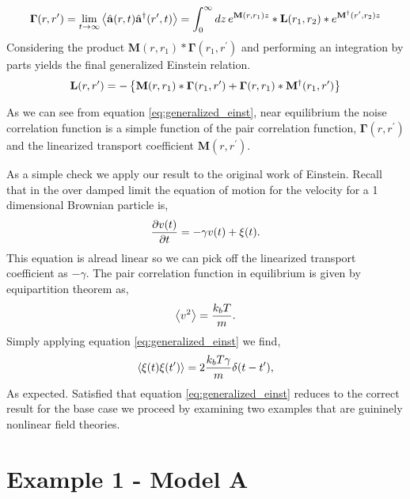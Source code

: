 %
\begin{equation}
    \mathbf{\Gamma}(r, r^\prime) = \lim_{t\rightarrow\infty}
    \left\langle \hat{\mathbf{a}}(r, t)\hat{\mathbf{a}}^\dagger(r^\prime, t) \right\rangle =
    \int_0^\infty dz \,e^{\mathbf{M}(r, r_1)z}\ast\mathbf{L}(r_1, r_2)\ast
    e^{\mathbf{M}^\dagger(r^\prime, r_2)z}
\end{equation}
%
Considering the product $\mathbf{M}(r, r_1)\ast\mathbf{\Gamma}(r_1, r^\prime)$
and performing an integration by parts yields the final generalized Einstein
relation.
%
\begin{equation}
    \label{eq:generalized_einst} 
    \mathbf{L}(r, r^\prime) = - \left\lbrace
          \mathbf{M}(r, r_1) 
     \ast \mathbf{\Gamma}(r_1, r^\prime) 
        + \mathbf{\Gamma}(r, r_1)
     \ast \mathbf{M}^\dagger(r_1, r^\prime) \right\rbrace
\end{equation}
%

As we can see from equation \ref{eq:generalized_einst}, near equilibrium the
noise correlation function is a simple function of the pair correlation
function, $\mathbf{\Gamma}(r, r^\prime)$ and the linearized transport
coefficient $\mathbf{M}(r, r^\prime)$.

As a simple check we apply our result to the original work of Einstein. Recall
that in the over damped limit the equation of motion for the velocity for a 1
dimensional Brownian particle is,
%
\begin{equation}
    \frac{\partial v(t)}{\partial t} = -\gamma v (t) + \xi(t).
\end{equation}
%
This equation is alread linear so we can pick off the linearized transport
coefficient as $-\gamma$. The pair correlation function in equilibrium is given
by equipartition theorem as,
%
\begin{equation}
    \left\langle v^2 \right\rangle = \frac{k_b T}{m}.
\end{equation}
%
Simply applying equation \ref{eq:generalized_einst} we find,
%
\begin{equation}
    \left\langle \xi(t)\xi(t^\prime) \right\rangle = 2 \frac{k_b T \gamma}{m} \delta(t - t^\prime),
\end{equation}
%
As expected. Satisfied that equation \ref{eq:generalized_einst} reduces to 
the correct result for the base case we proceed by examining two examples
that are guininely nonlinear field theories.

\section{Example 1 - Model A} %

